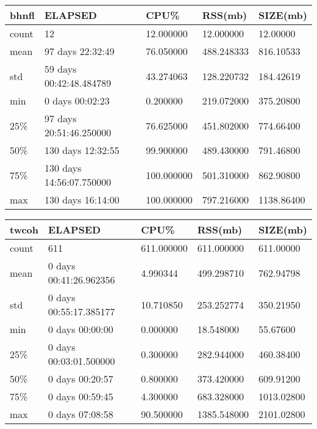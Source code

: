 \documentclass{article}
\begin{document}
\begin{tabular}{|l|l|l|l|l|}
\hline 
\hline bhnfl&    ELAPSED&   CPU\%&   RSS(mb)&   SIZE(mb) \\
\hline count&    12&  12.000000&  12.000000&  12.00000 \\
\hline mean&   97 days 22:32:49&  76.050000& 488.248333&  816.10533 \\
\hline std&   59 days 00:42:48.484789&  43.274063& 128.220732&  184.42619 \\
\hline min&    0 days 00:02:23&  0.200000& 219.072000&  375.20800 \\
\hline 25\%&   97 days 20:51:46.250000&  76.625000& 451.802000&  774.66400 \\
\hline 50\%&   130 days 12:32:55&  99.900000& 489.430000&  791.46800 \\
\hline 75\%&  130 days 14:56:07.750000& 100.000000& 501.310000&  862.90800 \\
\hline max&   130 days 16:14:00& 100.000000& 797.216000& 1138.86400 \\
\hline 
\end{tabular}
 
\begin{tabular}{|l|l|l|l|l|}
\hline 
\hline twcoh& ELAPSED&   CPU\%&  RSS(mb)&   SIZE(mb) \\
\hline count&    611& 611.000000&  611.000000&  611.00000 \\
\hline mean&  0 days 00:41:26.962356&  4.990344&  499.298710&  762.94798 \\
\hline std&  0 days 00:55:17.385177&  10.710850&  253.252774&  350.21950 \\
\hline min&   0 days 00:00:00&  0.000000&  18.548000&  55.67600 \\
\hline 25\%&  0 days 00:03:01.500000&  0.300000&  282.944000&  460.38400 \\
\hline 50\%&   0 days 00:20:57&  0.800000&  373.420000&  609.91200 \\
\hline 75\%&   0 days 00:59:45&  4.300000&  683.328000& 1013.02800 \\
\hline max&   0 days 07:08:58&  90.500000& 1385.548000& 2101.02800 \\
\hline 
\end{tabular}
 
\end{document}

